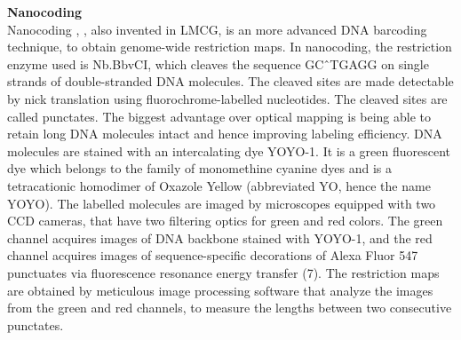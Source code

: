 \documentclass[11pt]{extarticle} %
\begin{document}
\noindent
{\bf{Nanocoding}} \\
Nanocoding \cite{Jo_etal_2007_PNAS}, \cite{Jo_etal_2009}, also invented in LMCG, is an more advanced DNA barcoding technique, to obtain genome-wide restriction maps. In nanocoding, the restriction enzyme used is Nb.BbvCI, which cleaves the sequence GC\^\ TGAGG on single strands of double-stranded DNA molecules. The cleaved sites are made detectable by nick translation using fluorochrome-labelled nucleotides. The cleaved sites are called punctates. The biggest advantage over optical mapping is being able to retain long DNA molecules intact and hence improving labeling efficiency. DNA molecules are stained with an intercalating dye YOYO-1. It is a green fluorescent dye which belongs to the family of monomethine cyanine dyes and is a tetracationic homodimer of Oxazole Yellow (abbreviated YO, hence the name YOYO). The labelled molecules are imaged by microscopes equipped with two CCD cameras, that have two filtering optics for green and red colors. The green channel acquires images of DNA backbone stained with YOYO-1, and the red channel acquires images of sequence-specific decorations of Alexa Fluor 547 punctuates via fluorescence resonance energy transfer (7). The restriction maps are obtained by meticulous image processing software that analyze the images from the green and red channels, to measure the lengths between two consecutive punctates.  \\
\end{document}
